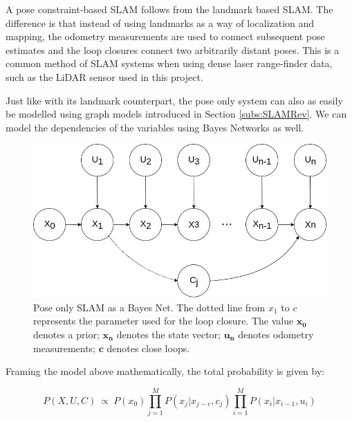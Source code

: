 \documentclass[12pt]{article}
\begin{document}
A pose constraint-based SLAM follows from the landmark based SLAM. The difference is that instead of using landmarks as a way of localization and mapping, the odometry measurements are used to connect subsequent pose estimates and the loop closures connect two arbitrarily distant poses. This is a common method of SLAM systems when using dense laser range-finder data, such as the LiDAR sensor used in this project. 

Just like with its landmark counterpart, the pose only system can also as easily be modelled using graph models introduced in Section \ref{subs:SLAMRev}. We can model the dependencies of the variables using Bayes Networks as well.
	
\begin{figure}
\begin{minipage}{0.65\textwidth}
\centering
\includegraphics[width=\textwidth]{BayesNetSLAMPoseOnly}
\end{minipage} \hfill
\begin{minipage}{0.35\textwidth}
\centering
\caption{Pose only SLAM as a Bayes Net. The dotted line from $x_1$ to $c$ represents the parameter used for the loop closure. The value $\mathbf{x_0}$ denotes a prior; $\mathbf{x_n}$ denotes the state vector; $\mathbf{u_n}$ denotes odometry measurements; $\mathbf{c}$ denotes close loops.}
\label{fig:slam2}
\end{minipage}				
\end{figure}

Framing the model above mathematically, the total probability is given by:

\begin{equation}
P(X,U,C)\ \propto \ P(x_0)\prod_{j=1}^{M}P(x_j|x_{j-c},c_j)\prod_{i=1}^{M}P(x_i|x_{i-1}, u_i)
\label{eq:probSLAM2}
\end{equation}
	
\end{document}

